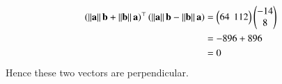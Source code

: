 \documentclass[journal,11pt,twocolumn]{IEEEtran}
\begin{document}
\begin{align}
	\left(\left\lVert\mathbf{a}\right\rVert\mathbf{b}+\left\lVert\mathbf{b}\right\rVert\mathbf{a}\right)^{\top}\left(\left\lVert\mathbf{a}\right\rVert\mathbf{b}-\left\lVert\mathbf{b}\right\rVert\mathbf{a}\right) &= \begin{pmatrix}64 \hspace{0.15cm} 112\end{pmatrix}\begin{pmatrix}-14 \\ 8\end{pmatrix}\\
	&= -896+896\\
	&= 0
\end{align}
Hence these two vectors are perpendicular.
\end{document}
